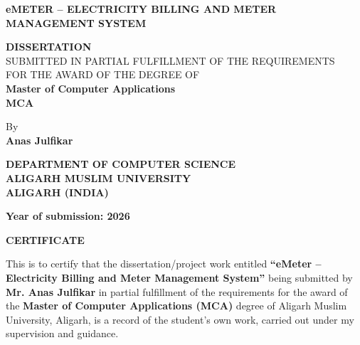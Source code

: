 \documentclass[12pt, a4paper, onecolumn]{report}
\begin{document}

\begin{titlepage}
    \centering
    \textbf{eMETER -- ELECTRICITY BILLING AND METER MANAGEMENT SYSTEM}
   
    \vspace{1.5cm}
    \fontsize{14}{17}\selectfont
    \textbf{DISSERTATION}\\
    SUBMITTED IN PARTIAL FULFILLMENT OF THE REQUIREMENTS\\
    FOR THE AWARD OF THE DEGREE OF\\
   
    \vspace{1.5cm}
    \fontsize{16}{19}\selectfont
    \textbf{Master of Computer Applications}\\[0.5em]
    \textbf{MCA}
   
    \vspace{1.5cm}
    \fontsize{12}{15}\selectfont
    By\\
    \textbf{Anas Julfikar}
   
    \vspace{1cm}
   
    \vspace{1cm}
    \fontsize{12}{15}\selectfont
    \textbf{DEPARTMENT OF COMPUTER SCIENCE}\\
    \textbf{ALIGARH MUSLIM UNIVERSITY}\\
    \textbf{ALIGARH (INDIA)}
   
    \vfill
    \fontsize{12}{15}\selectfont
    \textbf{Year of submission: 2026}

\end{titlepage}

\newpage
\begin{center}
    \Huge \textbf{CERTIFICATE}
\end{center}
\vspace{1cm}
This is to certify that the dissertation/project work entitled \textbf{``eMeter -- Electricity Billing and Meter Management System''} being submitted by \textbf{Mr. Anas Julfikar} in partial fulfillment of the requirements for the award of the \textbf{Master of Computer Applications (MCA)} degree of Aligarh Muslim University, Aligarh, is a record of the student's own work, carried out under my supervision and guidance.
\end{document}
